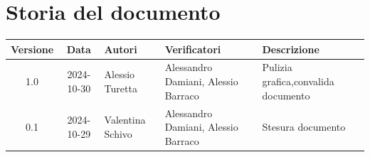 \section{Storia del documento}
\begin{tabularx}{\textwidth}{ c c p{3cm} p{3.17cm} X }
    \rowcolor{gray!20}\rule{0pt}{0.5cm}\textbf{Versione} & \textbf{Data} & \textbf{Autori} & \textbf{Verificatori} & \textbf{Descrizione} \\[0.7ex]
    \hline
    \rule{0pt}{0.5cm}1.0 & 2024-10-30 & Alessio Turetta & Alessandro Damiani, \newline Alessio Barraco & Pulizia grafica,\newline convalida documento\\[3.5ex]
    \hline
    \rule{0pt}{0.5cm}0.1 & 2024-10-29 & Valentina Schivo & Alessandro Damiani, \newline Alessio Barraco & Stesura documento\\[0.7ex] 
\end{tabularx}
